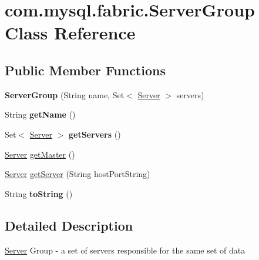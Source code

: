 \hypertarget{classcom_1_1mysql_1_1fabric_1_1_server_group}{}\section{com.\+mysql.\+fabric.\+Server\+Group Class Reference}
\label{classcom_1_1mysql_1_1fabric_1_1_server_group}
\subsection*{Public Member Functions}
\begin{DoxyCompactItemize}
\item 
\mbox{\label{classcom_1_1mysql_1_1fabric_1_1_server_group_a7892c5f9e9bccde2648483f472aacb66}} 
{\bfseries Server\+Group} (String name, Set$<$ \mbox{\hyperlink{classcom_1_1mysql_1_1fabric_1_1_server}{Server}} $>$ servers)
\item 
\mbox{\label{classcom_1_1mysql_1_1fabric_1_1_server_group_a0cc8d3c7673938cf3deb77f9ab49300f}} 
String {\bfseries get\+Name} ()
\item 
\mbox{\label{classcom_1_1mysql_1_1fabric_1_1_server_group_a62643c7fceb03a17630e40562c655a43}} 
Set$<$ \mbox{\hyperlink{classcom_1_1mysql_1_1fabric_1_1_server}{Server}} $>$ {\bfseries get\+Servers} ()
\item 
\mbox{\hyperlink{classcom_1_1mysql_1_1fabric_1_1_server}{Server}} \mbox{\hyperlink{classcom_1_1mysql_1_1fabric_1_1_server_group_ac2ba8dc80be8118578f35d07727297d8}{get\+Master}} ()
\item 
\mbox{\hyperlink{classcom_1_1mysql_1_1fabric_1_1_server}{Server}} \mbox{\hyperlink{classcom_1_1mysql_1_1fabric_1_1_server_group_aa0c3aa4598de2ca177d4df8bf95dae23}{get\+Server}} (String host\+Port\+String)
\item 
\mbox{\label{classcom_1_1mysql_1_1fabric_1_1_server_group_a73f8ac6b7b3b77c9933d6d66a3f0b2ed}} 
String {\bfseries to\+String} ()
\end{DoxyCompactItemize}


\subsection{Detailed Description}
\mbox{\hyperlink{classcom_1_1mysql_1_1fabric_1_1_server}{Server}} Group -\/ a set of servers responsible for the same set of data 


